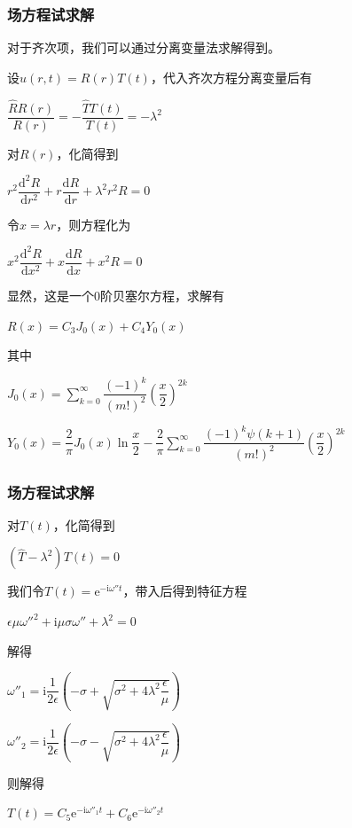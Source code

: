 \documentclass[11pt]{beamer}                                                                                               \usetheme{Boadilla}
\begin{document}
	\begin{frame}[fragile]
		\frametitle{场方程试求解}
		对于齐次项，我们可以通过分离变量法求解得到。
		
		设$u(r,t)=R(r)T(t)$，代入齐次方程分离变量后有
		
		\centerline{$\dfrac{\hat{R}R(r)}{R(r)}=-\dfrac{\hat{T}T(t)}{T(t)}=-\lambda^2$}
		
		对$R(r)$，化简得到
		
		
		
		\centerline{$r^2\dfrac{\mathrm{d}^2 R}{\mathrm{d}r^2}+r\dfrac{\mathrm{d} R}{\mathrm{d}r}+\lambda^2 r^2R=0$}
		
		令$x=\lambda r$，则方程化为
		
		\centerline{$x^2\dfrac{\mathrm{d}^2 R}{\mathrm{d}x^2}+x\dfrac{\mathrm{d} R}{\mathrm{d}x}+ x^2R=0$}
		
		显然，这是一个0阶贝塞尔方程，求解有
		
		\centerline{$R(x)=C_3 J_0(x)+C_4 Y_0(x)$}
		
		其中
		\centerline{$J_0(x)=\displaystyle\sum_{k=0}^{\infty}\dfrac{(-1)^k}{(m!)^2}\left(\dfrac{x}{2}\right)^{2k}$}
		
		\centerline{$Y_0(x)=\dfrac{2}{\pi} J_0(x) \ln\dfrac{x}{2}-\dfrac{2}{\pi}\displaystyle\sum_{k=0}^{\infty}\dfrac{(-1)^k \psi(k+1)}{(m!)^2}\left(\dfrac{x}{2}\right)^{2k}$}
		
	\end{frame}
	
	\begin{frame}[fragile]
		\frametitle{场方程试求解}
		对$T(t)$，化简得到
		
		\centerline{$(\hat{T}-\lambda^2)T(t)=0$}
		
	    我们令$T(t)=\mathrm{e}^{-\mathrm{i}\omega'' t}$，带入后得到特征方程
		
		\centerline{$\epsilon\mu\omega''^2+\mathrm{i}\mu\sigma\omega''+\lambda^2=0$}
		
		解得
		
		\centerline{$\omega''_1=\mathrm{i}\dfrac{1}{2\epsilon}\left(-{\sigma}+\sqrt{\sigma^2+4\lambda^2\dfrac{\epsilon}{\mu}}\right)$}
		
		\centerline{$\omega''_2=\mathrm{i}\dfrac{1}{2\epsilon}\left(-{\sigma}-\sqrt{\sigma^2+4\lambda^2\dfrac{\epsilon}{\mu}}\right)$}
		
		则解得
		
		\centerline{$T(t)=C_5\mathrm{e}^{-\mathrm{i}\omega''_1 t}+C_6\mathrm{e}^{-\mathrm{i}\omega''_2 t}$}
		
		
	\end{frame}
	
\end{document}
